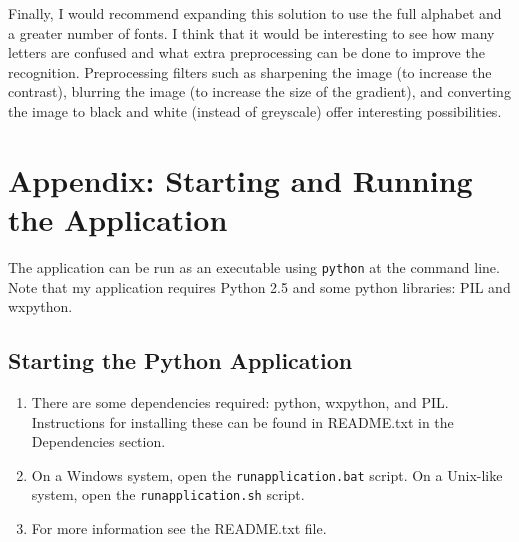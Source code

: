 \documentclass[12pt,letterpaper,oneside]{report}
\newcommand \code[1]{\texttt{#1}}
\begin{document}
Finally, I would recommend expanding this solution to use the full alphabet and a greater number of fonts. I think that it would be interesting to see how many letters are confused and what extra preprocessing can be done to improve the recognition. Preprocessing filters such as sharpening the image (to increase the contrast), blurring the image (to increase the size of the gradient), and converting the image to black and white (instead of greyscale) offer interesting possibilities.

\clearpage
\section{Appendix: Starting and Running the Application}\label{apx:running}
The application can be run as an executable using \texttt{python} at the command line.
Note that my application requires Python 2.5 and some python libraries: PIL and wxpython.

\subsection{Starting the Python Application}
\begin{enumerate}
  \item There are some dependencies required: python, wxpython, and PIL. Instructions for installing these can be found in README.txt in the Dependencies section.
  \item On a Windows system, open the \code{runapplication.bat} script. On a
      Unix-like system, open the \code{runapplication.sh} script.
  \item For more information see the README.txt file.
\end{enumerate}

%
\end{document}
